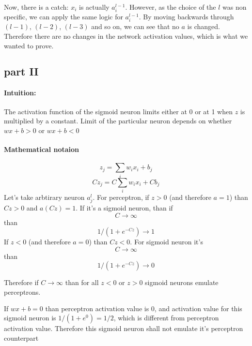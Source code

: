 \documentclass{article}
\begin{document}
Now, there is a catch: $x_i$ is actually $a_{i}^{l-1}$. However, as the choice of the $l$ was non specific,
we can apply the same logic for $a_{i}^{l-1}$.
By moving backwards through $(l-1)$, $(l-2)$, $(l-3)$ and so on, we can see that no $a$ is changed. 
Therefore there are no changes in the network activation values, which is what we wanted to prove.

\subsection{part II}
\paragraph{Intuition:} 
The activation function of the sigmoid neuron limits either at 0 or at 1 when $z$
is multiplied by a constant. Limit of the particular neuron depends on whether $wx + b > 0$ or $wx + b < 0$
\paragraph{Mathematical notaion} 
\begin{equation*}
  z_{j} = \sum_{i}w_ix_i + b_j
\end{equation*}
\begin{equation*}
  Cz_{j} = C\sum_{i}w_ix_i + Cb_j
\end{equation*}
Let's take arbtirary neuron $a_j^l$. For perceptron, if $z > 0$ (and therefore $a = 1$) than $Cz > 0$ and $a(Cz)=1$. 
If it's a sigmoid neuron, than if $$C \to \infty$$ than $$1/(1 + e^{-Cz}) \to 1$$
If $z < 0$  (and therefore $a = 0$) than $Cz < 0$. 
For sigmoid neuron it's $$C \to \infty$$ than $$1/(1 + e^{-Cz}) \to 0$$

Therefore if $C \to \infty$ than for all $z < 0$ or $z > 0$ sigmoid neurons emulate perceptrons.

If $wx + b = 0$ than perceptron activation value is $0$, and activation value for this sigmoid neuron is
$1/(1 + e ^ 0) = 1/2$, which is different from perceptron activation value. Therefore this sigmoid neuron shall not emulate
it's perceptron counterpart
\end{document}
